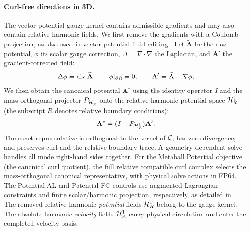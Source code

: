 \paragraph{Curl-free directions in 3D.}
{The vector-potential gauge kernel contains admissible gradients and may also contain relative harmonic fields. We first remove the gradients with a Coulomb projection, as also used in vector-potential fluid editing \citep{chen2026obstacle}. Let $\widetilde{\mathbf A}$ be the raw potential, $\phi$ its scalar gauge correction, $\Delta=\nabla\cdot\nabla$ the Laplacian, and $\mathbf A'$ the gradient-corrected field:}
\begin{equation}
\Delta\phi=\operatorname{div}\widetilde{\mathbf A},\qquad \phi|_{\partial\Omega}=0,
\qquad \mathbf A'=\widetilde{\mathbf A}-\nabla\phi,
\label{eq:poisson-gauge}
\end{equation}
We then obtain the canonical potential $\mathbf A^\circ$ using the identity operator $I$ and the mass-orthogonal projector $P_{\mathcal H_R^1}$ onto the relative harmonic potential space $\mathcal H_R^1$ (the subscript $R$ denotes relative boundary conditions):
\begin{equation}
\mathbf A^\circ=(I-P_{\mathcal H_R^1})\mathbf A'.
\label{eq:vector-gauge}
\end{equation}
The exact representative is orthogonal to the kernel of $\mathcal C$, has zero divergence, and preserves curl and the relative boundary trace. A geometry-dependent solve handles all mode right-hand sides together. For the Metaball Potential objective (the canonical curl quotient), the full relative compatible curl complex selects the mass-orthogonal canonical representative, with physical solve actions in FP64. The Potential-AL and Potential-FG controls use augmented-Lagrangian constraints and finite scalar/harmonic projection, respectively, as detailed in . The removed relative harmonic \emph{potential} fields $\mathcal H_R^1$ belong to the gauge kernel. The absolute harmonic \emph{velocity} fields $\mathcal H_A^1$ carry physical circulation and enter the completed velocity basis.


